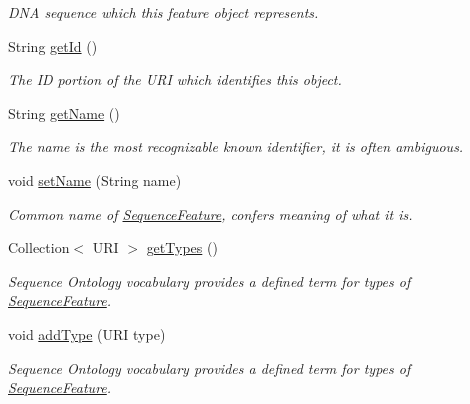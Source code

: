 \begin{DoxyCompactItemize}
\begin{DoxyCompactList}\small\item\em DNA sequence which this feature object represents. \item\end{DoxyCompactList}\item 
String \hyperlink{classorg_1_1sbolstandard_1_1lib_s_b_o_lj_1_1_sequence_feature_aab219518f0eaf3db55b6a62ad6b49407}{getId} ()
\begin{DoxyCompactList}\small\item\em The ID portion of the URI which identifies this object. \item\end{DoxyCompactList}\item 
String \hyperlink{classorg_1_1sbolstandard_1_1lib_s_b_o_lj_1_1_sequence_feature_a78ee178b6a73658d65ca60da4d1e6683}{getName} ()
\begin{DoxyCompactList}\small\item\em The name is the most recognizable known identifier, it is often ambiguous. \item\end{DoxyCompactList}\item 
void \hyperlink{classorg_1_1sbolstandard_1_1lib_s_b_o_lj_1_1_sequence_feature_ad737b36b74be994e0d8420797ed72f78}{setName} (String name)
\begin{DoxyCompactList}\small\item\em Common name of \hyperlink{classorg_1_1sbolstandard_1_1lib_s_b_o_lj_1_1_sequence_feature}{SequenceFeature}, confers meaning of what it is. \item\end{DoxyCompactList}\item 
Collection$<$ URI $>$ \hyperlink{classorg_1_1sbolstandard_1_1lib_s_b_o_lj_1_1_sequence_feature_a518b97368db3de477d5fb57150d8b711}{getTypes} ()
\begin{DoxyCompactList}\small\item\em Sequence Ontology vocabulary provides a defined term for types of \hyperlink{classorg_1_1sbolstandard_1_1lib_s_b_o_lj_1_1_sequence_feature}{SequenceFeature}. \item\end{DoxyCompactList}\item 
void \hyperlink{classorg_1_1sbolstandard_1_1lib_s_b_o_lj_1_1_sequence_feature_a26d3aea2567e9235daef5a79a5e6a521}{addType} (URI type)
\begin{DoxyCompactList}\small\item\em Sequence Ontology vocabulary provides a defined term for types of \hyperlink{classorg_1_1sbolstandard_1_1lib_s_b_o_lj_1_1_sequence_feature}{SequenceFeature}. \item\end{DoxyCompactList}\item 

\end{DoxyCompactItemize}
